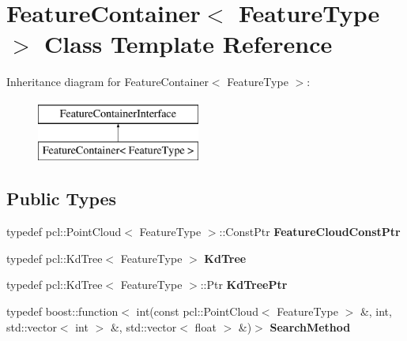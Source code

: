 \hypertarget{classFeatureContainer}{
\section{FeatureContainer$<$ FeatureType $>$ Class Template Reference}
\label{classFeatureContainer}
}
Inheritance diagram for FeatureContainer$<$ FeatureType $>$:\begin{figure}[H]
\begin{center}
\leavevmode
\includegraphics[height=2.000000cm]{classFeatureContainer}
\end{center}
\end{figure}
\subsection*{Public Types}
\begin{DoxyCompactItemize}
\item 
\hypertarget{classFeatureContainer_a812a7f7cfef2ac98ddc5e2483de4fd20}{
typedef pcl::PointCloud$<$ FeatureType $>$::ConstPtr {\bfseries FeatureCloudConstPtr}}
\label{classFeatureContainer_a812a7f7cfef2ac98ddc5e2483de4fd20}

\item 
\hypertarget{classFeatureContainer_aa9b344b371c9e07ff390d1628dfbcaf4}{
typedef pcl::KdTree$<$ FeatureType $>$ {\bfseries KdTree}}
\label{classFeatureContainer_aa9b344b371c9e07ff390d1628dfbcaf4}

\item 
\hypertarget{classFeatureContainer_a4c74fecce5bc9b613831e10c8027da9b}{
typedef pcl::KdTree$<$ FeatureType $>$::Ptr {\bfseries KdTreePtr}}
\label{classFeatureContainer_a4c74fecce5bc9b613831e10c8027da9b}

\item 
\hypertarget{classFeatureContainer_ae50b6e9fde0e0c2533a18f905bb963de}{
typedef boost::function$<$ int(const pcl::PointCloud$<$ FeatureType $>$ \&, int, std::vector$<$ int $>$ \&, std::vector$<$ float $>$ \&)$>$ {\bfseries SearchMethod}}
\label{classFeatureContainer_ae50b6e9fde0e0c2533a18f905bb963de}

\end{DoxyCompactItemize}
